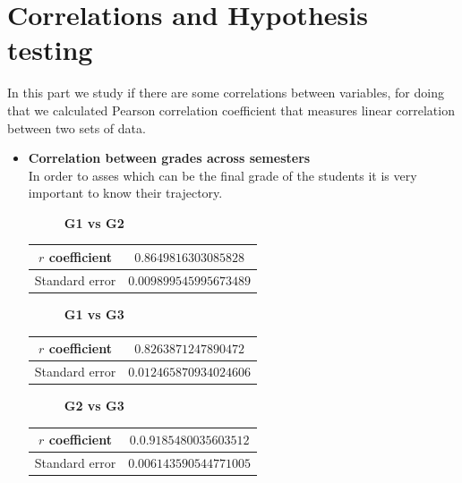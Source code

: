 \documentclass[a4paper, 11pt]{article}
\theoremstyle{definition}
\numberwithin{equation}{section}		%
\numberwithin{table}{section}				%
\begin{document}
\section{Correlations and Hypothesis testing}
In this part we study if there are some correlations between variables, for doing that we calculated Pearson correlation coefficient that measures linear correlation between two sets of data.

\begin{itemize}
\item \textbf{Correlation between grades across semesters}
\\In order to asses which can be the final grade of the students it is very important to know their trajectory.
\begin{figure}[h]
\centering
\textbf{G1 vs G2}\par\medskip
{}
\end{figure}
\begin{center}
\begin{tabular}{|c|c|}
 \hline
 $r$ coefficient & $0.8649816303085828$ \\
\hline
Standard error & $0.009899545995673489$ \\
 \hline
\end{tabular}
\end{center}

\begin{figure}[h]
\centering
\textbf{G1 vs G3}\par\medskip
{}
\end{figure}
\begin{center}
\begin{tabular}{|c|c|}
 \hline
 $r$ coefficient & $0.8263871247890472$ \\
\hline
Standard error & $0.012465870934024606$ \\
 \hline
\end{tabular}
\end{center}
\newpage
\begin{figure}[h]
\centering
\textbf{G2 vs G3}\par\medskip
{}
\end{figure}
\begin{center}
\begin{tabular}{|c|c|}
 \hline
 $r$ coefficient & $0.0.9185480035603512$ \\
\hline
Standard error & $0.006143590544771005$ \\
 \hline
\end{tabular}
\end{center}






\end{itemize}
\end{document}
